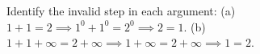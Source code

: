 Identify the invalid step in each argument: (a) $1+1=2\implies1^0+1^0=2^0\implies2=1$. (b) $1+1+\infty=2+\infty\implies1+\infty=2+\infty\implies1=2$.
